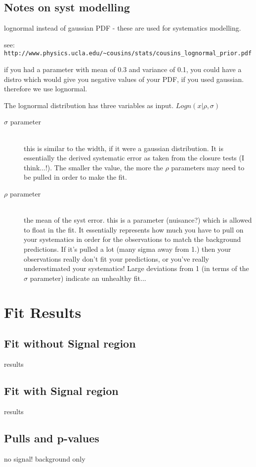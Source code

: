 \subsection{Notes on syst modelling}
lognormal instead of gaussian PDF - these are used for systematics modelling.

see:
\verb!http://www.physics.ucla.edu/~cousins/stats/cousins_lognormal_prior.pdf!

if you had a parameter with mean of 0.3 and variance of 0.1, you could have a 
distro which would give you negative values of your PDF, if you used gaussian. 
therefore we use lognormal.

The lognormal distribution has three variables as input. $Logn(x|\rho, \sigma)$

\begin{description}
\item[$\sigma$ parameter]\hfill \\ this is similar to the width, if it were a gaussian 
distribution. It is essentially the derived systematic error as taken from the 
closure tests (I think...!). The smaller the value, the more the $\rho$ 
parameters may need to be pulled in order to make the fit.
\item[$\rho$ parameter] \hfill \\ the mean of the syst error. this is a parameter
(nuisance?) which is allowed to float in the fit. It essentially represents how 
much you have to pull on your systematics in order for the observations to match
the background predictions. If it's pulled a lot (many sigma away from 1.) then 
your observations really don't fit your predictions, or you've really 
underestimated your systematics! Large deviations from 1 (in terms of the
$\sigma$ parameter) indicate an unhealthy fit...
\end{description}



\section{Fit Results}  %
\label{sec:results_fit}

\subsection{Fit without Signal region}
results

\subsection{Fit with Signal region}
results

\subsection{Pulls and p-values}
no signal! background only
